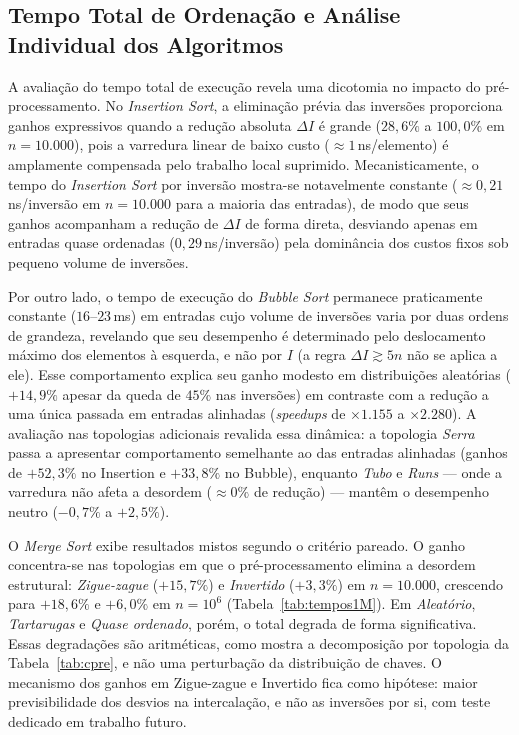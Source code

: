 \documentclass[portuguese]{sbc2025}%
\begin{document}
\subsection{Tempo Total de Ordenação e Análise Individual dos Algoritmos}

A avaliação do tempo total de execução revela uma dicotomia no impacto do pré-processamento. No \emph{Insertion Sort}, a eliminação prévia das inversões proporciona ganhos expressivos quando a redução absoluta $\Delta I$ é grande ($28{,}6\%$ a $100{,}0\%$ em $n{=}10.000$), pois a varredura linear de baixo custo ($\approx 1$\,ns/elemento) é amplamente compensada pelo trabalho local suprimido. Mecanisticamente, o tempo do \emph{Insertion Sort} por inversão mostra-se notavelmente constante ($\approx 0{,}21$\,ns/inversão em $n{=}10.000$ para a maioria das entradas), de modo que seus ganhos acompanham a redução de $\Delta I$ de forma direta, desviando apenas em entradas quase ordenadas ($0{,}29$\,ns/inversão) pela dominância dos custos fixos sob pequeno volume de inversões.

Por outro lado, o tempo de execução do \emph{Bubble Sort} permanece praticamente constante ($16$--$23$\,ms) em entradas cujo volume de inversões varia por duas ordens de grandeza, revelando que seu desempenho é determinado pelo deslocamento máximo dos elementos à esquerda, e não por $I$ (a regra $\Delta I \gtrsim 5n$ não se aplica a ele). Esse comportamento explica seu ganho modesto em distribuições aleatórias ($+14{,}9\%$ apesar da queda de $45\%$ nas inversões) em contraste com a redução a uma única passada em entradas alinhadas (\emph{speedups} de $\times 1.155$ a $\times 2.280$). A avaliação nas topologias adicionais revalida essa dinâmica: a topologia \emph{Serra} passa a apresentar comportamento semelhante ao das entradas alinhadas (ganhos de $+52{,}3\%$ no Insertion e $+33{,}8\%$ no Bubble), enquanto \emph{Tubo} e \emph{Runs} — onde a varredura não afeta a desordem ($\approx 0\%$ de redução) — mantêm o desempenho neutro ($-0{,}7\%$ a $+2{,}5\%$).

O \emph{Merge Sort} exibe resultados mistos segundo o critério pareado. O ganho concentra-se nas topologias em que o pré-processamento elimina a desordem estrutural: \emph{Zigue-zague} ($+15{,}7\%$) e \emph{Invertido} ($+3{,}3\%$) em $n{=}10.000$, crescendo para $+18{,}6\%$ e $+6{,}0\%$ em $n{=}10^6$ (Tabela~\ref{tab:tempos1M}). Em \emph{Aleatório}, \emph{Tartarugas} e \emph{Quase ordenado}, porém, o total degrada de forma significativa. Essas degradações são aritméticas, como mostra a decomposição por topologia da Tabela~\ref{tab:cpre}, e não uma perturbação da distribuição de chaves. O mecanismo dos ganhos em Zigue-zague e Invertido fica como hipótese: maior previsibilidade dos desvios na intercalação, e não as inversões por si, com teste dedicado em trabalho futuro.
\end{document}
